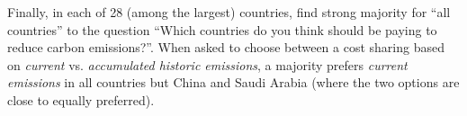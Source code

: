 Finally, in each of 28 (among the largest) countries, \citet{dabla-norris_public_2023} find strong majority for ``all countries'' to the question ``Which countries do you think should be paying to reduce carbon emissions?''. When asked to choose between a cost sharing based on \textit{current} vs. \textit{accumulated historic emissions}, a majority prefers \textit{current emissions} in all countries but China and Saudi Arabia (where the two options are close to equally preferred). %


